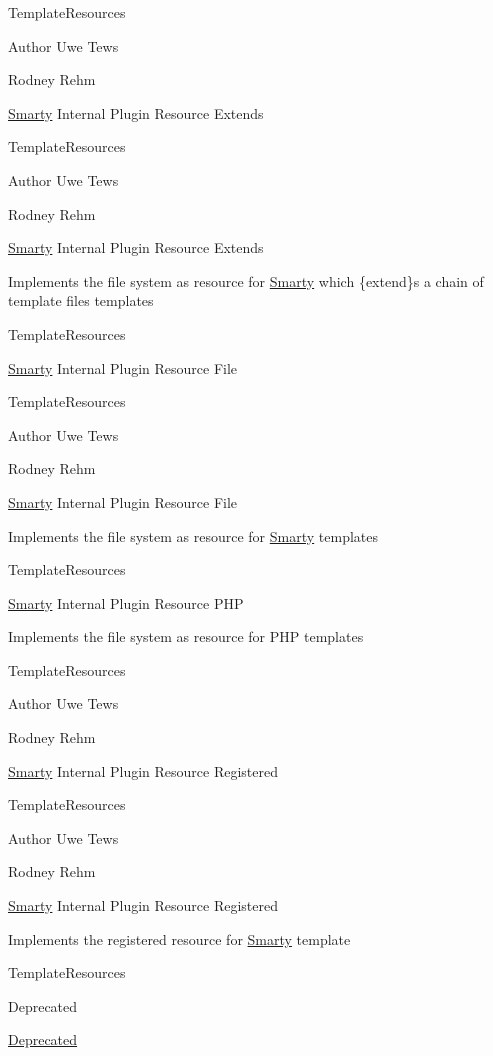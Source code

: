 Template\+Resources \begin{DoxyAuthor}{Author}
Uwe Tews 

Rodney Rehm
\end{DoxyAuthor}
\hyperlink{class_smarty}{Smarty} Internal Plugin Resource Extends

Template\+Resources \begin{DoxyAuthor}{Author}
Uwe Tews 

Rodney Rehm
\end{DoxyAuthor}
\hyperlink{class_smarty}{Smarty} Internal Plugin Resource Extends

Implements the file system as resource for \hyperlink{class_smarty}{Smarty} which \{extend\}s a chain of template files templates

Template\+Resources

\hyperlink{class_smarty}{Smarty} Internal Plugin Resource File

Template\+Resources \begin{DoxyAuthor}{Author}
Uwe Tews 

Rodney Rehm
\end{DoxyAuthor}
\hyperlink{class_smarty}{Smarty} Internal Plugin Resource File

Implements the file system as resource for \hyperlink{class_smarty}{Smarty} templates

Template\+Resources

\hyperlink{class_smarty}{Smarty} Internal Plugin Resource P\+H\+P

Implements the file system as resource for P\+H\+P templates

Template\+Resources \begin{DoxyAuthor}{Author}
Uwe Tews 

Rodney Rehm
\end{DoxyAuthor}
\hyperlink{class_smarty}{Smarty} Internal Plugin Resource Registered

Template\+Resources \begin{DoxyAuthor}{Author}
Uwe Tews 

Rodney Rehm
\end{DoxyAuthor}
\hyperlink{class_smarty}{Smarty} Internal Plugin Resource Registered

Implements the registered resource for \hyperlink{class_smarty}{Smarty} template

Template\+Resources \begin{DoxyRefDesc}{Deprecated}
\item[\hyperlink{deprecated__deprecated000003}{Deprecated}]\end{DoxyRefDesc}



